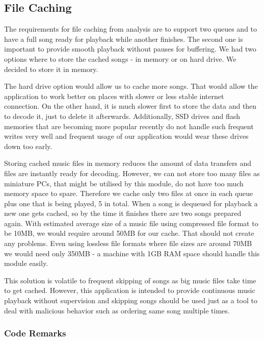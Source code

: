 \subsection{File Caching}

The requirements for file caching from analysis are to support two queues and to have a full song ready for playback while another finishes. The second one is important to provide smooth playback without pauses for buffering. We had two options where to store the cached songs - in memory or on hard drive. We decided to store it in memory.
\par
The hard drive option would allow us to cache more songs. That would allow the application to work better on places with slower or less stable internet connection. On the other hand, it is much slower first to store the data and then to decode it, just to delete it afterwards. Additionally, SSD drives and flash memories that are becoming more popular recently do not handle such frequent writes very well and frequent usage of our application would wear these drives down too early.
\par
Storing cached music files in memory reduces the amount of data transfers and files are instantly ready for decoding. However, we can not store too many files as miniature PCs, that might be utilised by this module, do not have too much memory space to spare. Therefore we cache only two files at once in each queue plus one that is being played, 5 in total. When a song is dequeued for playback a new one gets cached, so by the time it finishes there are two songs prepared again. With estimated average size of a music file using compressed file format to be 10MB, we would require around 50MB for our cache. That should not create any problems. Even using lossless file formats where file sizes are around 70MB we would need only 350MB - a machine with 1GB RAM space should handle this module easily.
\par
This solution is volatile to frequent skipping of songs as big music files take time to get cached. However, this application is intended to provide continuous music playback without supervision and skipping songs should be used just as a tool to deal with malicious behavior such as ordering same song multiple times.

\subsubsection{Code Remarks}

